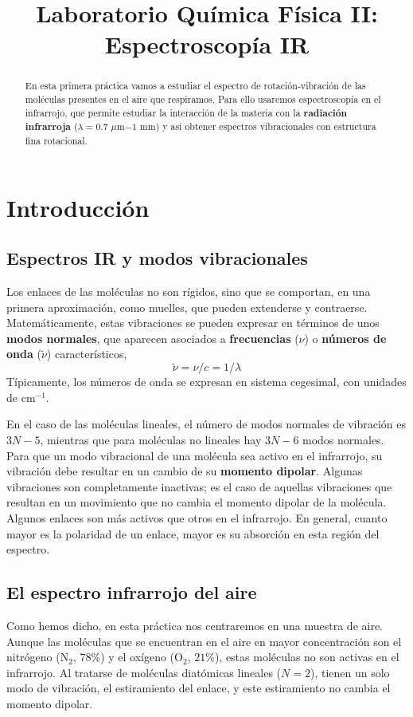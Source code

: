 \documentclass{tufte-handout}
\title[Práticas Química Física II: IR]{
Laboratorio Química Física II: Espectroscopía IR}
\date{}  %
\begin{document}
\maketitle%

\begin{abstract}
\noindent En esta primera práctica vamos a estudiar el espectro de rotación-vibración
de las moléculas presentes en el aire que respiramos. Para ello usaremos
espectroscopía en el infrarrojo, que permite estudiar la interacción de la
materia con la \textbf{radiación infrarroja} ($\lambda=0.7$ $\mu$m$-1$ mm) 
y así obtener espectros vibracionales con estructura fina rotacional.
\end{abstract}


\section{Introducción}
\subsection{Espectros IR y modos vibracionales}
Los enlaces de las moléculas no son rígidos, sino que se comportan,
en una primera aproximación, como muelles, que pueden extenderse y contraerse.
Matemáticamente, estas vibraciones se pueden expresar en términos de unos
\textbf{modos normales}, que aparecen asociados a \textbf{frecuencias} ($\nu$)
o \textbf{números de onda} ($\tilde{\nu}$) característicos,
\begin{equation}
\tilde{\nu}=\nu/c=1/\lambda
\end{equation}
Típicamente, los números de onda se expresan en sistema cegesimal, con unidades de cm$^{-1}$.

En el 
caso de las moléculas lineales, el número de modos normales de vibración 
es $3N-5$, mientras que para moléculas no lineales hay $3N-6$ modos normales.
Para que un modo vibracional de una molécula sea activo en el infrarrojo, 
su vibración debe resultar en un cambio de su \textbf{momento dipolar}.
Algunas vibraciones son completamente inactivas; es el caso de aquellas
vibraciones que resultan en un movimiento que no cambia el momento dipolar
de la molécula. Algunos enlaces son más activos que otros en el infrarrojo. 
En general, cuanto mayor es la polaridad de un enlace, mayor es su 
absorción en esta región del espectro. 

\subsection{El espectro infrarrojo del aire}
Como hemos dicho, en esta práctica nos centraremos en una muestra de aire.
Aunque  las moléculas que se encuentran en el aire en mayor concentración 
son el nitrógeno (N$_2$, $78$\%) y el oxígeno (O$_2$, $21$\%), estas moléculas no son activas 
en el infrarrojo. Al tratarse de moléculas diatómicas lineales ($N=2$), 
tienen un solo modo de vibración, el estiramiento del enlace, y este 
estiramiento no cambia el momento dipolar. 
\end{document}
